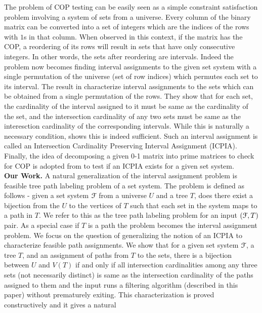 \documentclass[a4paper,UKenglish,numberwithinsect]{lipics}
\def\cF{{\cal F}}
\begin{document}
\noindent
The problem of COP testing can be easily seen as a simple constraint
satisfaction problem involving a system of sets from a universe. Every
column of the binary matrix can be converted into a set of integers
which are the indices of the rows with $1$s in that column. When
observed in this context, if the matrix has the COP, a reordering of its
rows will result in sets that have only consecutive integers. In other
words, the sets after reordering are intervals. Indeed the problem now
becomes finding 
interval assignments to the given set system \cite{nsnrs09} with a
single permutation of the universe (set of row indices) which permutes each
set to its interval. The result in \cite{nsnrs09} characterize
interval assignments to the sets which can be obtained from a single
permutation of the rows.  They show that for each set, the cardinality
of the interval assigned to it must be same as the cardinality of the set,
and the intersection cardinality of any two sets must be same as the
interesction cardinality of the corresponding intervals.  While this
is naturally a necessary condition, \cite{nsnrs09} shows this is indeed
sufficient.  Such an interval assignment is called an Intersection
Cardinality Preserving Interval Assignment (ICPIA).  Finally, the idea of
decomposing a given 0-1 matrix into prime matrices to check for COP is
adopted from 
\cite{wlh02} to test if an ICPIA exists for a given set system.\\
{\bf Our Work.}
A natural generalization of the interval assignment problem is
feasible tree path labeling problem of a set system. The problem is
defined as follows - given a set system 
$\cF$ from a universe $U$ and a tree $T$, does there exist a bijection
from the $U$ to the vertices of $T$ such that each set in the system
maps to a path in $T$.  We refer to this as the tree path labeling
problem for an input $(\cF,T)$ pair. As a special case if $T$ is a path
the problem becomes the interval assignment problem.  We focus on the
question of generalizing the notion of an ICPIA \cite{nsnrs09} to
characterize feasible path assignments.  We show that for a given set
system $\cF$, a tree $T$, and an assignment of paths from $T$ to the sets,
there is a bijection between $U$ and $V(T)$ if and only if all
intersection cardinalities among any three sets (not necessarily distinct)
is same as the intersection cardinality of the paths assigned to them
and the input runs a filtering algorithm (described in
this paper) without prematurely exiting.
This characterization is proved constructively and it gives a natural
\end{document}
